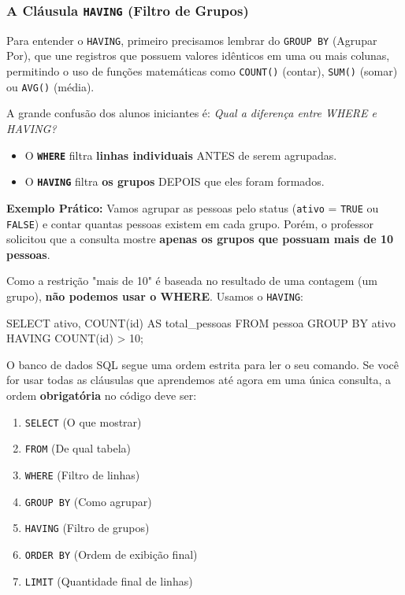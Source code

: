 \subsubsection{A Cláusula \texttt{HAVING} (Filtro de Grupos)}

Para entender o \texttt{HAVING}, primeiro precisamos lembrar do \texttt{GROUP BY} (Agrupar Por), que une registros que possuem valores idênticos em uma ou mais colunas, permitindo o uso de funções matemáticas como \texttt{COUNT()} (contar), \texttt{SUM()} (somar) ou \texttt{AVG()} (média).

A grande confusão dos alunos iniciantes é: \textit{Qual a diferença entre WHERE e HAVING?}
\begin{itemize}
    \item O \textbf{\texttt{WHERE}} filtra \textbf{linhas individuais} ANTES de serem agrupadas.
    \item O \textbf{\texttt{HAVING}} filtra \textbf{os grupos} DEPOIS que eles foram formados.
\end{itemize}

\textbf{Exemplo Prático:} Vamos agrupar as pessoas pelo status (\texttt{ativo} = \texttt{TRUE} ou \texttt{FALSE}) e contar quantas pessoas existem em cada grupo. Porém, o professor solicitou que a consulta mostre \textbf{apenas os grupos que possuam mais de 10 pessoas}. 

Como a restrição "mais de 10" é baseada no resultado de uma contagem (um grupo), \textbf{não podemos usar o WHERE}. Usamos o \texttt{HAVING}:

\begin{sqlcode}
SELECT ativo, COUNT(id) AS total_pessoas
FROM pessoa
GROUP BY ativo
HAVING COUNT(id) > 10;
\end{sqlcode}

\vspace{0.5cm}
\begin{tcolorbox}[colback=red!5,colframe=red!70!black,title=Atenção à Ordem de Execução!]
O banco de dados SQL segue uma ordem estrita para ler o seu comando. Se você for usar todas as cláusulas que aprendemos até agora em uma única consulta, a ordem \textbf{obrigatória} no código deve ser:
\begin{enumerate}
    \item \texttt{SELECT} (O que mostrar)
    \item \texttt{FROM} (De qual tabela)
    \item \texttt{WHERE} (Filtro de linhas)
    \item \texttt{GROUP BY} (Como agrupar)
    \item \texttt{HAVING} (Filtro de grupos)
    \item \texttt{ORDER BY} (Ordem de exibição final)
    \item \texttt{LIMIT} (Quantidade final de linhas)
\end{enumerate}
\end{tcolorbox}



